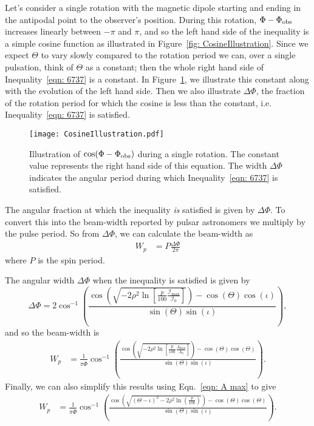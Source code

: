 \documentclass[../full_thesis/full_thesis.tex]{subfiles}
\begin{document}
Let's consider a single rotation with the magnetic dipole starting and ending in
the antipodal point to the observer's position. During this rotation, $\Phi -
\Phi_{\mathrm{obs}}$ increases linearly between $-\pi$ and $\pi$, and so the left hand side of the
inequality is a simple cosine function as illustrated in Figure~\ref{fig:
CosineIllustration}.  Since we expect $\Theta$ to vary slowly compared to the
rotation period we can, over a single pulsation, think of $\Theta$ as a
constant; then the whole right hand side of Inequality~\eqref{eqn: 6737} is a
constant. In Figure~\ref{fig: CosineIllustration}, we illustrate this constant
along with the evolution of the left hand side. Then we also illustrate $\Delta\Phi$,
the fraction of the rotation period for which the cosine is less than the
constant, i.e. Inequality~\eqref{eqn: 6737} is satisfied.
\begin{figure}[ht]
\centering
\texttt{[image: CosineIllustration.pdf]}
\caption{Illustration of $\cos(\Phi-\Phi_{\mathrm{obs}})$ during a single rotation. The constant
         value represents the right hand side of this equation. The
         width $\Delta\Phi$ indicates the angular period during which
         Inequality~\eqref{eqn: 6737} is satisfied.}
\label{fig: CosineIllustration}
\end{figure}

The angular fraction at which the inequality \emph{is} satisfied is given by
$\Delta\Phi$. To convert this into the beam-width reported by pulsar
astronomers we multiply by the pulse period. So from $\Delta\Phi$, we can
calculate the beam-width as
\begin{align}
    W_{p} & = P \frac{\Delta\Phi}{2\pi}
\end{align}
where $P$ is the spin period.

The angular width $\Delta\Phi$ when the inequality is satisfied is given by
\begin{equation}
    \Delta\Phi = 2\cos^{-1}\left(
                \frac{
\cos\left(\sqrt{-2\rho^{2}\ln\left[\frac{p}{100}\frac{\mathcal{I}_{\mathrm{max}}}{\mathcal{I}_0}\right]}\right) - \cos(\Theta)\cos(\iota)}
                          {\sin(\Theta)\sin(\iota)}
                      \right),
\end{equation}
and so the beam-width is
\begin{align}
    W_{p} & = \frac{1}{\pi\dot{\Phi}}
               \cos^{-1}\left(
                   \frac{\cos\left(
\sqrt{-2\rho^{2}\ln\left[\frac{p}{100}\frac{A_{\mathrm{max}}}{A_0}\right]}
\right) - \cos(\Theta)\cos(\Theta)}
                          {\sin(\Theta)\sin(\iota)}
                  \right).
\end{align}
Finally, we can also simplify this results using Eqn.~\eqref{eqn: A max} to give
\begin{align}
    W_{p} & = \frac{1}{\pi\dot{\Phi}}
               \cos^{-1}\left(
                   \frac{\cos\left(
\sqrt{(\Theta-\iota)^2 - 2\rho^2 \ln\left(\frac{p}{100}\right)}
\right) - \cos(\Theta)\cos(\Theta)}
                          {\sin(\Theta)\sin(\iota)}
                  \right).
\label{eqn: Wp}
\end{align}
\end{document}
